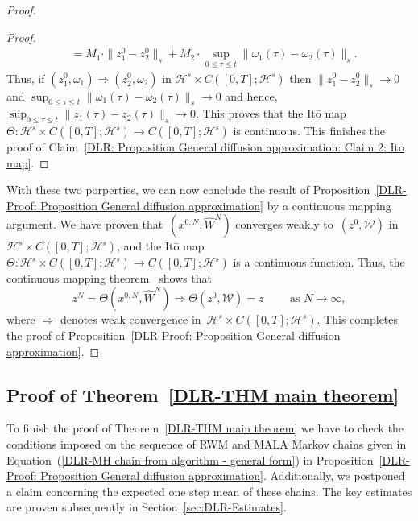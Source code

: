 \begin{proof}
\begin{proof}
\begin{align*}
      & = M_1 \cdot \| z_1^0 - z_2^0 \|_s + M_2 \cdot \sup_{0 \leq \tau \leq t}  \| \omega_1(\tau) - \omega_2(\tau) \|_s.
    \end{align*}
    Thus, if $(z^0_1, \omega_1) \Longrightarrow (z^0_2, \omega_2)$ in $\mathcal{H}^s \times C([0,T]; \mathcal{H}^s)$ then $\| z_1^0 - z_2^0 \|_s \to 0$ and $\sup_{0 \leq \tau \leq t}  \| \omega_1(\tau) - \omega_2(\tau) \|_s \to 0$ and hence, $\sup_{0 \leq \tau \leq t} \| z_1(\tau) - z_2(\tau) \|_s \to 0$. This proves that the It\={o} map~$\Theta : \mathcal{H}^s \times C([0,T]; \mathcal{H}^s) \to  C([0,T]; \mathcal{H}^s)$ is continuous. This finishes the proof of Claim~\ref{DLR: Proposition General diffusion approximation: Claim 2: Ito map}.
     
  \end{proof}   
  
  With these two porperties, we can now conclude the result of Proposition~\ref{DLR-Proof: Proposition General diffusion approximation} by a continuous mapping argument. We have proven that~$(x^{0,N}, \widehat{W}^N)$ converges weakly to~$(z^0, \mathcal{W})$ in~$\mathcal{H}^s \times C([0,T];\mathcal{H}^s)$, and the It\={o} map~$\Theta : \mathcal{H}^s \times C([0,T]; \mathcal{H}^s) \to  C([0,T]; \mathcal{H}^s)$ is a continuous function. Thus, the continuous mapping theorem~\autocite[Theorem 4.27]{Kallenberg2001} shows that
  \begin{equation*}
    z^N = \Theta (x^{0,N}, \widehat{W}^N) \Longrightarrow \Theta (z^0, \mathcal{W}) = z \qquad \text{  as } N \to \infty,
  \end{equation*}
  where $ \Longrightarrow$ denotes weak convergence in~$\mathcal{H}^s \times C([0,T]; \mathcal{H}^s)$. This completes the proof of Proposition~\ref{DLR-Proof: Proposition General diffusion approximation}.
  
   
\end{proof}


\subsection{Proof of Theorem~\ref{DLR-THM main theorem}}
\label{sec:sub:DLR-Proof}

To finish the proof of Theorem~\ref{DLR-THM main theorem} we have to check the conditions imposed on  the sequence of RWM and MALA Markov chains given in Equation~(\ref{DLR-MH chain from algorithm - general form}) in Proposition~\ref{DLR-Proof: Proposition General diffusion approximation}. Additionally, we postponed a claim concerning the expected one step mean of these chains. The key estimates are proven subsequently in Section~\ref{sec:DLR-Estimates}.

